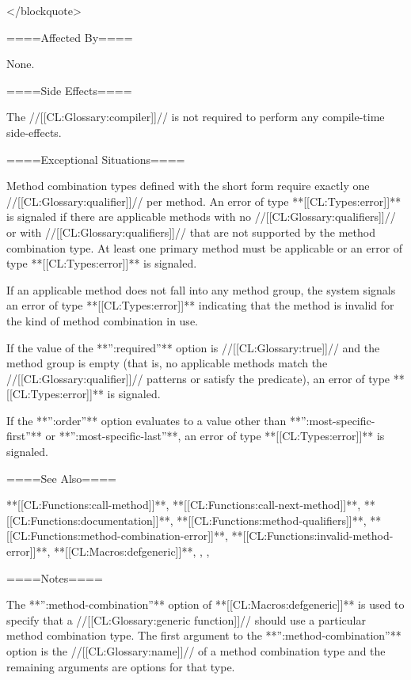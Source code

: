 </blockquote>

====Affected By====

None.

====Side Effects====

The //[[CL:Glossary:compiler]]// is not required to perform any compile-time side-effects.

====Exceptional Situations====

Method combination types defined with the short form require exactly one //[[CL:Glossary:qualifier]]// per method. An error of type **[[CL:Types:error]]** is signaled if there are applicable methods with no //[[CL:Glossary:qualifiers]]// or with //[[CL:Glossary:qualifiers]]// that are not supported by the method combination type. At least one primary method must be applicable or an error of type **[[CL:Types:error]]** is signaled.

If an applicable method does not fall into any method group, the system signals an error of type **[[CL:Types:error]]** indicating that the method is invalid for the kind of method combination in use.

If the value of the **'':required''** option is //[[CL:Glossary:true]]// and the method group is empty (that is, no applicable methods match the //[[CL:Glossary:qualifier]]// patterns or satisfy the predicate), an error of type **[[CL:Types:error]]** is signaled.

If the **'':order''** option evaluates to a value other than **'':most-specific-first''** or **'':most-specific-last''**, an error of type **[[CL:Types:error]]** is signaled.

====See Also====

**[[CL:Functions:call-method]]**, **[[CL:Functions:call-next-method]]**, **[[CL:Functions:documentation]]**, **[[CL:Functions:method-qualifiers]]**, **[[CL:Functions:method-combination-error]]**, **[[CL:Functions:invalid-method-error]]**, **[[CL:Macros:defgeneric]]**, {\secref\MethodSelectionAndCombination}, {\secref\BuiltInMethCombTypes}, {\secref\DocVsDecls}

====Notes====



The **'':method-combination''** option of **[[CL:Macros:defgeneric]]** is used to specify that a //[[CL:Glossary:generic function]]// should use a particular method combination type. The first argument to the **'':method-combination''** option is the //[[CL:Glossary:name]]// of a method combination type and the remaining arguments are options for that type.


    
